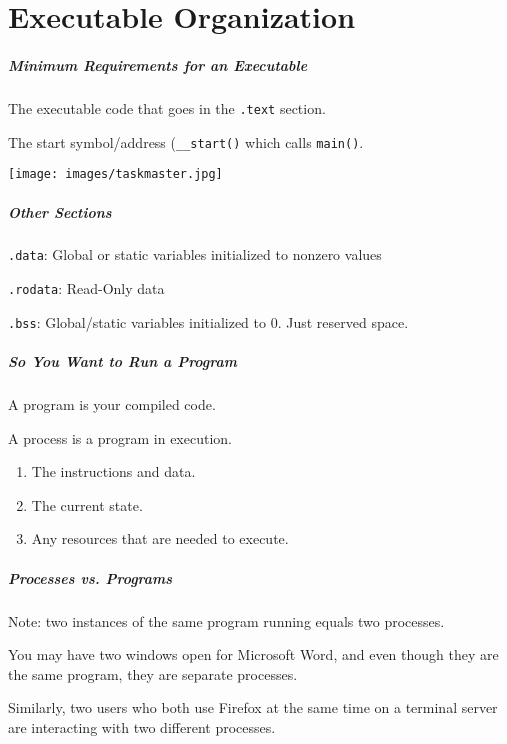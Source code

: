\part{Executable Organization}

\begin{frame}
\partpage
\end{frame}


\begin{frame}
\frametitle{Minimum Requirements for an Executable}

The executable code that goes in the \texttt{.text} section.

The start symbol/address (\texttt{\_\_start()} which calls \texttt{main()}.

\begin{center}
  \texttt{[image: images/taskmaster.jpg]}
\end{center}

\end{frame}

\begin{frame}
\frametitle{Other Sections}

\texttt{.data}: Global or static variables initialized to nonzero values

\texttt{.rodata}: Read-Only data

\texttt{.bss}: Global/static variables initialized to 0. Just reserved space.

\end{frame}

\begin{frame}
\frametitle{So You Want to Run a Program}

A \alert{program} is your compiled code.

A \alert{process} is a program in execution. 

	\begin{enumerate}
		\item The instructions and data.
		\item The current state.
		\item Any resources that are needed to execute.
	\end{enumerate}

\end{frame}


\begin{frame}
	\frametitle{Processes vs. Programs}

	Note: two instances of the same program running equals two processes.

	You may have two windows open for Microsoft Word, and even though they are the same program, they are separate processes.


	Similarly, two users who both use Firefox at the same time on a terminal server are interacting with two different processes.

\end{frame}


